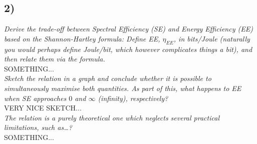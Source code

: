 \subsection{2)}
\textit{Derive the trade-off between Spectral Efficiency (SE) and Energy Efficiency (EE) based on the Shannon-Hartley formula: Define EE, $\eta_{EE}$, in bits/Joule (naturally you would perhaps define Joule/bit, which however complicates things a bit), and then relate them via the formula.}\\

SOMETHING...\\

\textit{Sketch the relation in a graph and conclude whether it is possible to simultaneously maximise both quantities. As part of this, what happens to EE when SE approaches $0$ and $\infty$ (infinity), respectively?}\\

VERY NICE SKETCH...\\

\textit{The relation is a purely theoretical one which neglects several practical limitations, such as…?}\\

SOMETHING...


